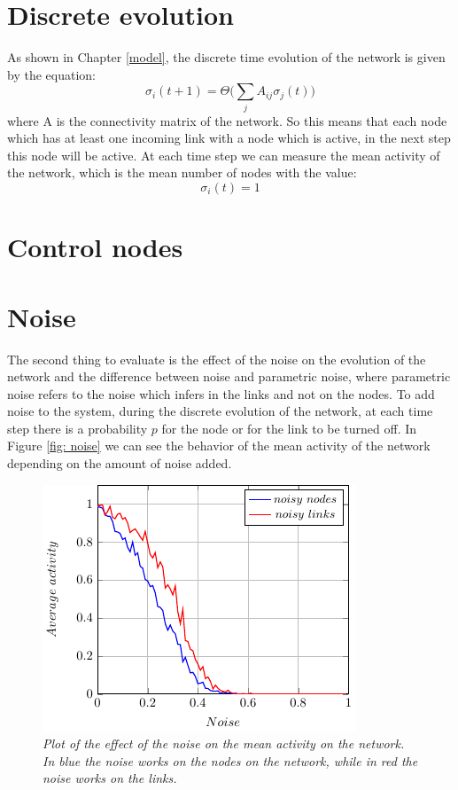 \section{Discrete evolution}
As shown in Chapter \ref{model}, the discrete time evolution of the network is given by the equation:
$$
\sigma_i(t+1)=\Theta\biggl(\sum_jA_{ij}\sigma_j(t)\biggr)
$$
where A is the connectivity matrix of the network.
So this means that each node which has at least one incoming link with a node which is active, in the next step this node will be active.
At each time step we can measure the mean activity of the network, which is the mean number of nodes with the value:
$$
\sigma_i(t) = 1
$$
\section{Control nodes}

\section{Noise}
The second thing to evaluate is the effect of the noise on the evolution of the network and the difference between noise and parametric noise, where parametric noise refers to the noise which infers in the links and not on the nodes.
To add noise to the system, during the discrete evolution of the network, at each time step there is a probability $p$ for the node or for the link to be turned off.
In Figure \ref{fig: noise} we can see the behavior of the mean activity of the network depending on the amount of noise added.
\begin{figure}[h]
\centering
\includegraphics[scale=1.5]{images/noise.pdf}
\caption{\emph{Plot of the effect of the noise on the mean activity on the network. In blue the noise works on the nodes on the network, while in red the noise works on the links.}}
\label{fig:noise}
\end{figure}

